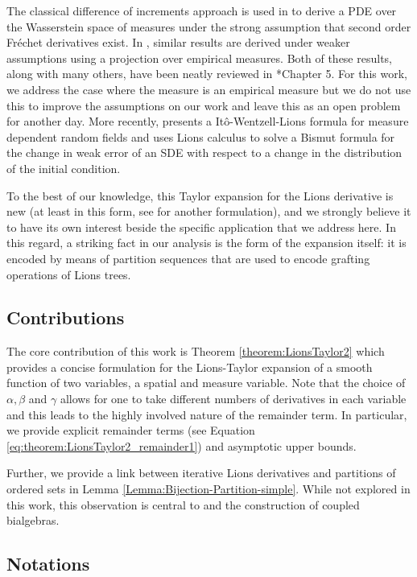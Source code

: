 \documentclass[a4paper,11pt,twoside]{article}
\numberwithin{equation}{section}
\theoremstyle{plain}
\newcommand{\1}{\mathbbm{1}}
\begin{document}
	The classical difference of increments approach is used in \cite{buckdahn2017mean} to derive a PDE over the Wasserstein space of measures under the strong assumption that second order Fr\'echet derivatives exist. In \cite{chassagneux2014classical}, similar results are derived under weaker assumptions using a projection over empirical measures. Both of these results, along with many others, have been neatly reviewed in \cite{CarmonaDelarue2017book1}*{Chapter 5}. For this work, we address the case where the measure is an empirical measure but we do not use this to improve the assumptions on our work and leave this as an open problem for another day. More recently, \cite{dos2022Ito} presents a It\^o-Wentzell-Lions formula for measure dependent random fields and \cite{Ren2019Bismut} uses Lions calculus to solve a Bismut formula for the change in weak error of an SDE with respect to a change in the distribution of the initial condition. 
	
	To the best of our knowledge, this Taylor expansion for the Lions derivative is new (at least in this form, see \cite{TseHigher2021} for another formulation), and we strongly believe it to have its own interest beside the specific application that we address here. In this regard, a striking fact in our analysis is the form of the expansion itself: it is encoded by means of partition sequences that are used to encode grafting operations of Lions trees. 
	
	\subsection{Contributions}
	The core contribution of this work is Theorem \ref{theorem:LionsTaylor2} which provides a concise formulation for the Lions-Taylor expansion of a smooth function of two variables, a spatial and measure variable. Note that the choice of $\alpha, \beta$ and $\gamma$ allows for one to take different numbers of derivatives in each variable and this leads to the highly involved nature of the remainder term. In particular, we provide explicit remainder terms (see Equation \eqref{eq:theorem:LionsTaylor2_remainder1}) and asymptotic upper bounds. 
	
	Further, we provide a link between iterative Lions derivatives and partitions of ordered sets in Lemma \ref{Lemma:Bijection-Partition-simple}. While not explored in this work, this observation is central to \cite{salkeld2022LionsTrees} and the construction of coupled bialgebras. 
	
	\subsection*{Notations}
	\label{subsection:Notation}
	
\end{document}
